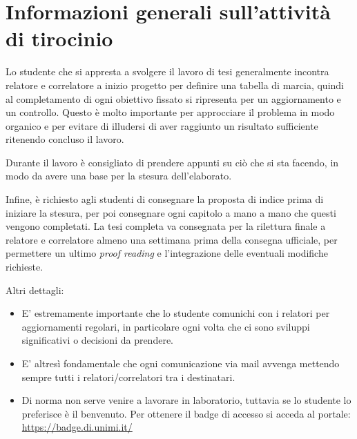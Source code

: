 \chapter{Informazioni generali sull'attività di tirocinio}
Lo studente che si appresta a svolgere il lavoro di tesi generalmente incontra relatore e correlatore a inizio progetto per definire una tabella di marcia, quindi al completamento di ogni obiettivo fissato si ripresenta per un aggiornamento e un controllo. Questo è molto importante per approcciare il problema in modo organico e per evitare di illudersi di aver raggiunto un risultato sufficiente ritenendo concluso il lavoro.

Durante il lavoro è consigliato di prendere appunti su ciò che si sta facendo, in modo da avere una base per la stesura dell'elaborato.

Infine, è richiesto agli studenti di consegnare la proposta di indice prima di iniziare la stesura, per poi consegnare ogni capitolo a mano a mano che questi vengono completati. La tesi completa va consegnata per la rilettura finale a relatore e correlatore almeno una settimana prima della consegna ufficiale, per permettere un ultimo \textit{proof reading} e l'integrazione delle eventuali modifiche richieste.

Altri dettagli:
\begin{itemize}
    \item E' estremamente importante che lo studente comunichi con i relatori per aggiornamenti regolari, in particolare ogni volta che ci sono sviluppi significativi o decisioni da prendere.
    \item E' altresì fondamentale che ogni comunicazione via mail avvenga mettendo sempre tutti i relatori/correlatori tra i destinatari.
    \item Di norma non serve venire a lavorare in laboratorio, tuttavia se lo studente lo preferisce è il benvenuto. Per ottenere il badge di accesso si acceda al portale: \url{https://badge.di.unimi.it/}
\end{itemize}

